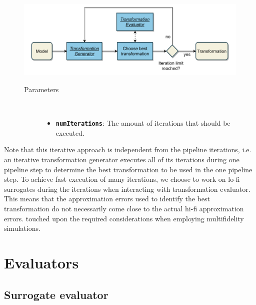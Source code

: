 \documentclass[
  a4paper,  %
  twoside,  %
  bibliography=totoc,
  headsepline,
  cleardoublepage=empty,
  parskip=half,
  draft=false
]{scrbook}
\begin{document}
\begin{mdframed}[style=style,frametitle={Transformation generator (iterative)}]
\begin{figure}[H]
	\includegraphics[width=\textwidth]{graphics/TransformationGen_Iterative.pdf}

\delimit

\begin{description}
\item[Parameters] {~ \begin{itemize}[\null]
\item \texttt{\textbf{numIterations}}: The amount of iterations that should be executed.
\end{itemize}}
\end{description}

\delimit
{}
\label{fig:itg}
\end{figure}
\end{mdframed}


Note that this iterative approach is independent from the pipeline iterations, i.e. an iterative transformation generator executes all of its iterations during one pipeline step to determine the best transformation to be used in the one pipeline step.
To achieve fast execution of many iterations, we choose to work on lo-fi surrogates during the iterations when interacting with transformation evaluator.
This means that the approximation errors used to identify the best transformation do not necessarily come close to the actual hi-fi approximation errors.
 touched upon the required considerations when employing multifidelity simulations.

\newpage
\section {Evaluators}

\subsection {Surrogate evaluator}
\label{sec:se}
\end{document}
